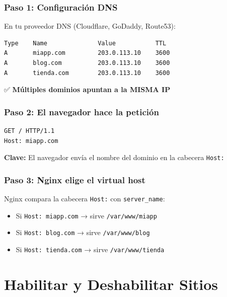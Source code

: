 \documentclass[11pt,a4paper]{article}
\begin{document}
\subsubsection{Paso 1: Configuración DNS}

En tu proveedor DNS (Cloudflare, GoDaddy, Route53):

\begin{tcolorbox}[colback=green!5!white,colframe=green!75!black,title=Registros DNS]
\begin{verbatim}
Type    Name              Value           TTL
A       miapp.com         203.0.113.10    3600
A       blog.com          203.0.113.10    3600
A       tienda.com        203.0.113.10    3600
\end{verbatim}
\end{tcolorbox}

✅ \textbf{Múltiples dominios apuntan a la MISMA IP}

\subsubsection{Paso 2: El navegador hace la petición}

\begin{lstlisting}[language=html]
GET / HTTP/1.1
Host: miapp.com
\end{lstlisting}

\textbf{Clave:} El navegador envía el nombre del dominio en la cabecera \texttt{Host:}

\subsubsection{Paso 3: Nginx elige el virtual host}

Nginx compara la cabecera \texttt{Host:} con \texttt{server\_name}:

\begin{itemize}
    \item Si \texttt{Host: miapp.com} → sirve \texttt{/var/www/miapp}
    \item Si \texttt{Host: blog.com} → sirve \texttt{/var/www/blog}
    \item Si \texttt{Host: tienda.com} → sirve \texttt{/var/www/tienda}
\end{itemize}

\section{Habilitar y Deshabilitar Sitios}
\end{document}
